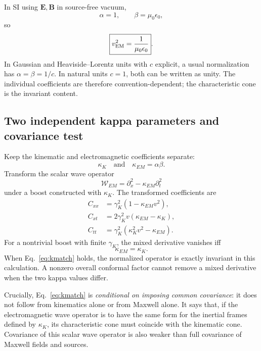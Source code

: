 \documentclass[11pt,a4paper]{article}
\begin{document}
In SI using $\mathbf E,\mathbf B$ in source-free vacuum,
\begin{equation}
\alpha=1,
\qquad
\beta=\mu_0\epsilon_0,
\end{equation}
so
\begin{equation}
\boxed{v_{\rm EM}^2=\frac1{\mu_0\epsilon_0}}.
\end{equation}
In Gaussian and Heaviside--Lorentz units with $c$ explicit, a usual normalization has $\alpha=\beta=1/c$. In natural units $c=1$, both can be written as unity. The individual coefficients are therefore convention-dependent; the characteristic cone is the invariant content.

\subsection{Two independent kappa parameters and covariance test}
Keep the kinematic and electromagnetic coefficients separate:
\begin{equation}
\kappa_K \quad\text{and}\quad \kappa_{EM}=\alpha\beta.
\end{equation}
Transform the scalar wave operator
\begin{equation}
\mathcal W_{EM}=\partial_x^2-\kappa_{EM}\partial_t^2
\end{equation}
under a boost constructed with $\kappa_K$. The transformed coefficients are
\begin{align}
C_{xx}&=\gamma_K^2(1-\kappa_{EM}v^2),\\
C_{xt}&=2\gamma_K^2v(\kappa_{EM}-\kappa_K),\\
C_{tt}&=\gamma_K^2(\kappa_K^2v^2-\kappa_{EM}).
\end{align}
For a nontrivial boost with finite $\gamma_K$, the mixed derivative vanishes iff
\begin{equation}
\boxed{\kappa_{EM}=\kappa_K}.
\label{eq:kmatch}
\end{equation}
When Eq.~\eqref{eq:kmatch} holds, the normalized operator is exactly invariant in this calculation. A nonzero overall conformal factor cannot remove a mixed derivative when the two kappa values differ.

Crucially, Eq.~\eqref{eq:kmatch} is \emph{conditional on imposing common covariance}: it does not follow from kinematics alone or from Maxwell alone. It says that, if the electromagnetic wave operator is to have the same form for the inertial frames defined by $\kappa_K$, its characteristic cone must coincide with the kinematic cone. Covariance of this scalar wave operator is also weaker than full covariance of Maxwell fields and sources.
\end{document}
